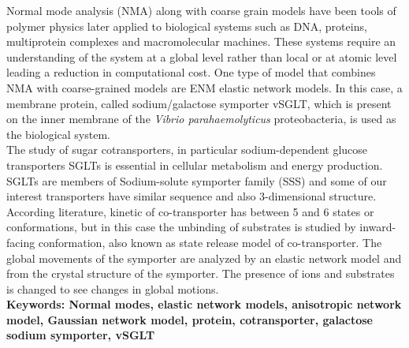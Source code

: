 Normal mode analysis (NMA) along with coarse grain models have been tools of polymer physics later applied to biological systems such as DNA, proteins, multiprotein complexes and macromolecular machines. These systems require an understanding of the system at a global level rather than local or at atomic level leading a reduction in computational cost. One type of model that combines NMA with coarse-grained models are ENM elastic network models. In this case, a membrane protein, called sodium/galactose symporter vSGLT, which is present on the inner membrane of the \textit{Vibrio parahaemolyticus} proteobacteria, is used as the biological system.\\

The study of sugar cotransporters, in particular sodium-dependent glucose transporters SGLTs is essential in cellular metabolism and energy production. SGLTs are members of Sodium-solute symporter family (SSS) and some of our interest transporters have similar sequence and also 3-dimensional structure. According literature, kinetic of co-transporter has between 5 and 6 states or conformations, but in this case the unbinding of substrates is studied by inward-facing conformation, also known as state release model of co-transporter. 
 The global movements of the symporter are analyzed by an elastic network model and from the crystal structure of the symporter. The presence of ions and substrates is changed to see changes in global motions. \\

\textbf{\small Keywords: Normal modes, elastic network models, anisotropic network model, Gaussian network model, protein, cotransporter, galactose sodium symporter, vSGLT}\\
